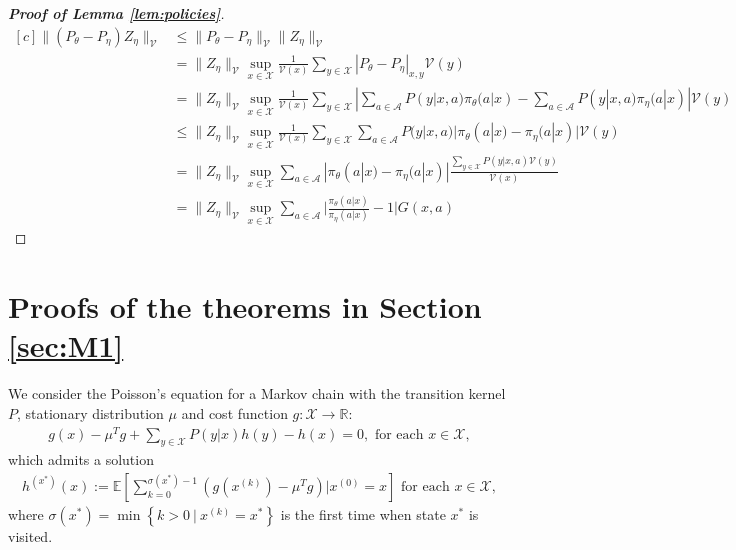 \documentclass[11pt]{article}
\newcommand{\R}{\mathbb{R}}
\newcommand{\E}{\mathbb{E}}
\newcommand{\X}{\mathcal{X}}
\newcommand{\A}{\mathcal{A}}
\newcommand{\V}{\mathcal{V}}
\theoremstyle{definition}
\numberwithin{equation}{section}
\begin{document}
\begin{proof}[\textbf{Proof of Lemma \ref{lem:policies}}]
    \begin{equation*}
\begin{aligned}[c]
     \|  (P_{\theta} - P_{\eta}) Z_{\eta}\|_\V&\leq  \|  P_{\theta} - P_{\eta} \|_\V\|Z_{\eta}\|_\V\\
     & = \|Z_{\eta}\|_\V\sup\limits_{x\in \X}\frac{1}{\V(x)} \sum\limits_{y\in \X} |P_{\theta} - P_{\eta}|_{x, y} \V(y)\\
     & = \|Z_{\eta}\|_\V\sup\limits_{x\in \X}\frac{1}{\V(x)} \sum\limits_{y\in \X} | \sum\limits_{a\in \A} P(y|x, a)\pi_\theta(a|x) - \sum\limits_{a\in \A} P(y|x, a)\pi_{\eta}(a|x)| \V(y)\\
          & \leq \|Z_{\eta}\|_\V\sup\limits_{x\in \X}\frac{1}{\V(x)} \sum\limits_{y\in \X} \sum\limits_{a\in \A} P(y|x, a) | \pi_\theta(a|x) -  \pi_{\eta}(a|x)| \V(y)\\
          & =\|Z_{\eta}\|_\V\sup\limits_{x\in \X}    \sum\limits_{a\in \A} | \pi_\theta(a|x) -  \pi_{\eta}(a|x)|    \frac{\sum\limits_{y\in \X} P(y|x, a) \V(y) }{\V(x)} \\
          &= \|Z_{\eta}\|_\V\sup\limits_{x\in \X}    \sum\limits_{a\in \A} \Big| \frac{\pi_\theta(a|x)}{ \pi_{\eta}(a|x)} - 1\Big|   G(x, a)
\end{aligned}
 \end{equation*}
\end{proof}





 \section{ Proofs of the theorems in Section \ref{sec:M1} }\label{sec:disc}

 We consider the Poisson's equation for a Markov chain with the transition kernel $P$, stationary distribution $\mu$ and cost function $g:\X\rightarrow \R$:
\begin{align*}
g(x) - \mu^Tg +\sum\limits_{y\in \X} P(y|x) h(y) - h(x) = 0, \text{ for each }x\in \X,
\end{align*}
which admits a solution
\begin{align*}
h^{(x^*)}(x):=\E\left[ \sum\limits_{k=0}^{\sigma(x^*)-1} \left(g (x^{(k)} )-\mu^Tg\right)|x^{(0)}=x \right] \text{ for each }x\in \X,
\end{align*}
where $\sigma(x^*) = \min\left\{k>0~|~x^{(k)}=x^*\right\}$ is the first time when state $x^*$ is visited.
\end{document}
